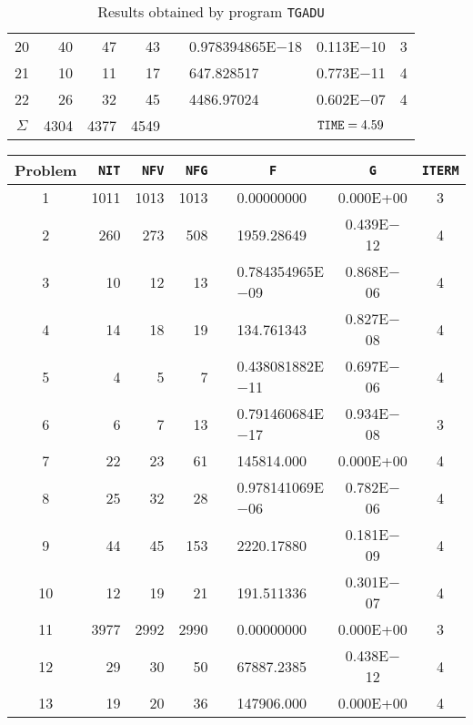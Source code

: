 \documentclass{esub2acm}
\begin{document}
\begin{table}
\begin{tabular}{c|rrrr@{}lcc}
20  &   40  &   47  &   43  &       &   0.978394865E$-$18   &   0.113E$-$10 &   3   \\
21  &   10  &   11  &   17  &       &   647.828517  &   0.773E$-$11 &   4   \\
22  &   26  &   32  &   45  &       &   4486.97024  &   0.602E$-$07 &   4   \\ \hline
$\Sigma$\rule[-2pt]{0pt}{12pt}  &   4304    &   4377    &   4549    &       &       &   ${\tt TIME} = 4.59$ &       \\ \hline
\end{tabular}
\caption{Results obtained by program {\tt TGADU}}
\label{tgadu}
\end{table}

\begin{table}
\footnotesize
\centering
\begin{tabular}{c|rrrr@{}lcc} \hline
Problem\rule[-2pt]{0pt}{12pt} & {\tt NIT} & {\tt NFV} & {\tt NFG} & \multicolumn{2}{c}{\tt F} & {\tt G} & {\tt ITERM} \\ \hline
1\rule[-2pt]{0pt}{12pt} &   1011    &   1013    &   1013    &       &   0.00000000  &   0.000E+00   &   3   \\
2   &   260 &   273 &   508 &       &   1959.28649  &   0.439E$-$12 &   4   \\
3   &   10  &   12  &   13  &       &   0.784354965E$-$09   &   0.868E$-$06 &   4   \\
4   &   14  &   18  &   19  &       &   134.761343  &   0.827E$-$08 &   4   \\
5   &   4   &   5   &   7   &       &   0.438081882E$-$11   &   0.697E$-$06 &   4   \\
6   &   6   &   7   &   13  &       &   0.791460684E$-$17   &   0.934E$-$08 &   3   \\
7   &   22  &   23  &   61  &       &   145814.000  &   0.000E+00   &   4   \\
8   &   25  &   32  &   28  &       &   0.978141069E$-$06   &   0.782E$-$06 &   4   \\
9   &   44  &   45  &   153 &       &   2220.17880  &   0.181E$-$09 &   4   \\
10  &   12  &   19  &   21  &       &   191.511336  &   0.301E$-$07 &   4   \\
11  &   3977    &   2992    &   2990    &       &   0.00000000  &   0.000E+00   &   3   \\
12  &   29  &   30  &   50  &       &   67887.2385  &   0.438E$-$12 &   4   \\
13  &   19  &   20  &   36  &       &   147906.000  &   0.000E+00   &   4   \\

\end{tabular}
\end{table}
\end{document}
